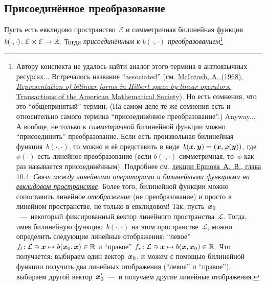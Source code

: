 \documentclass[a4paper,12pt]{article}
\theoremstyle{remark}
\begin{document}
  
  \subsection{Присоединённое преобразование}
  
  \begin{definition}
    Пусть есть евклидово пространство~$\mathcal E$ и симметричная билинейная функция~$b(\cdot, \cdot)\colon \mathcal E \hm\times \mathcal E \hm\to \RR$.
    Тогда \emph{присоединённым к $b(\cdot, \cdot)$ преобразованием}\footnote{
      Автору конспекта не удалось найти аналог этого термина в англоязычных ресурсах...
      Встречалось название ``associated'' (см. \href{https://community.ams.org/journals/tran/1968-131-02/S0002-9947-1968-0221299-7/S0002-9947-1968-0221299-7.pdf}{McIntosh, A. (1968). \emph{Representation of bilinear forms in Hilbert space by linear operators}. Transactions of the American Mathematical Society}).
      Но есть сомнения, что это ``общепринятый'' термин.
      (На самом деле те же сомнения есть и относительно самого термина ``присоединённое преобразование''.)
      Anyway...
      А вообще, не только к \emph{симметричной} билинейной функции можно ``присоединить'' преобразование.
      Если есть произвольная билинейная функция~$b(\cdot, \cdot)$, то можно и её представить в виде~$b(\bds x, \bds y) \hm= (\bds x, \phi(\bds y))$, где~$\phi(\cdot)$ есть линейное преобразование (если $b(\cdot, \cdot)$ симметричная, то~$\phi$ как раз называется присоединённым).
      Подробнее см. \href{https://linalge.page.link/Ershov_LA_2022}{лекции Ершова~А.~В., глава 10.4. \emph{Связь между линейными операторами и билинейными функциями на евклидовом пространстве}}.
      Более того, билинейной функции можно сопоставить линейное \emph{отображение} (не преобразование) и просто в линейном пространстве, не только в евклидовом!
      Так, пусть~$\boldsymbol x_0$~---~некоторый фиксированный вектор линейного пространства~$\mathcal L$.
      Тогда, имея билинейную функцию~$b(\cdot, \cdot)$ на этом пространстве~$\mathcal L$, можно определить следующие линейные отображения: ``левое'' $f_{l}\colon \mathcal L \hm\ni \bds x \hm\mapsto b(\bds x_0, \bds x) \hm\in \RR$ и ``правое'' $f_{r}\colon \mathcal L \hm\ni \bds x \hm\mapsto b(\bds x, \bds x_0) \hm\in \RR$.  %
      Что получается: выбираем один вектор~$\boldsymbol x_0$, и можем с помощью билинейной функции получить два линейных отображения (``левое'' и ``правое''), выбираем другой вектор~$\boldsymbol x_0'$~---~и получаем другие линейные отображения.
}
\end{definition}
\end{document}
